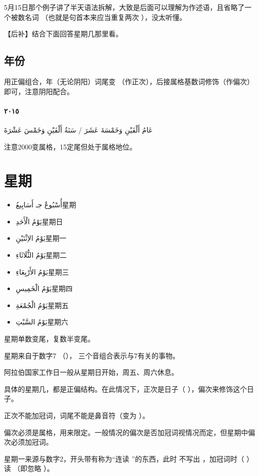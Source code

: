 \begin{note}
    5月15日那个例子讲了半天语法拆解，大致是后面可以理解为作述语，且省略了一个被数名词  （也就是句首本来应当重复两次  ），没太听懂。

    【后补】结合下面回答星期几那里看。
\end{note}

\subsection{年份}

用正偏组合，年（无论阴阳）词尾变  （作正次），后接属格基数词修饰（作偏次）即可，注意阴阳配合。

\begin{Arabic}
    \paragraph{٢٠١٥} عَامُ أَلْفَيْنِ وَخَمْسَةَ عَشَرَ / سَنَةُ أَلْفَيْنِ وَخَمْسَ عَشْرَةَ
\end{Arabic}

\begin{attention}
    注意2000变属格，15定尾但处于属格地位。
\end{attention}

\section{ 星期}

\begin{itemize}
    \item \ac{أُسْبُوعٌ جـ أَسَابِيعُ}{星期}
    \item \ac{يَوْمُ الْأَحَدِ}{星期日}
    \item \ac{يَوْمُ الاِثْنَيْنِ}{星期一}
    \item \ac{يَوْمُ الثُّلَاثَاءِ}{星期二}
    \item \ac{يَوْمُ الأَرْبِعَاءِ}{星期三}
    \item \ac{يَوْمُ الْخَمِيسِ}{星期四}
    \item \ac{يَوْمُ الْجُمْعَةِ}{星期五}
    \item \ac{يَوْمُ السَّبْتِ}{星期六}
\end{itemize}

\begin{attention}
    星期单数变尾，复数半变尾。

    星期来自于数字7 （）， 三个音组合表示与7有关的事物。 

    阿拉伯国家工作日一般从星期日开始，周五、周六休息。

    具体的星期几，都是正偏结构。在此情况下，正次是日子（  ），偏次来修饰这个日子。

    正次不能加冠词，词尾不能是鼻音符（变为  ）。

    偏次必须是属格，用来限定。一般情况的偏次是否加冠词视情况而定，但星期中偏次必须加冠词。

    星期一来源与数字2，开头带有称为“连读 ”的东西，此时  不写出 ，加冠词时（  ）读 （即忽略 ）。
\end{attention}

